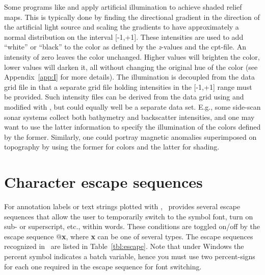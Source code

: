 Some programs like  and  apply artificial
illumination to achieve shaded relief maps.  This is typically done
by finding the directional gradient in the direction of the artificial
light source and scaling the gradients to have approximately a normal
distribution on the interval [-1,+1].  These intensities are used
to add ``white'' or ``black'' to the color as defined by the \emph{z}-values
and the cpt-file.  An intensity of zero leaves the color unchanged.
Higher values will brighten the color, lower values will darken it,
all without changing the original hue of the color (see Appendix~\ref{app:I}
for more details).  The illumination is decoupled from the data
grid file in that a separate grid file holding intensities in the
[-1,+1] range must be provided.  Such intensity files can be
derived from the data grid using  and modified
with , but could equally well be a separate data set.
E.g., some side-scan sonar systems collect both bathymetry and
backscatter intensities, and one may want to use the latter information
to specify the illumination of the colors defined by the former.
Similarly, one could portray magnetic anomalies superimposed on
topography by using the former for colors and the latter for shading. 

\section{Character escape sequences}
\label{sec:escape}

For annotation labels or text strings plotted with ,
\GMT\ provides several escape sequences that allow the user to
temporarily switch to the symbol font, turn on sub- or superscript,
etc., within words.  These conditions are toggled on/off by the
escape sequence @\textbf{x}, where \textbf{x} can be one of several types.
The escape sequences recognized in \GMT\ are listed in Table~\ref{tbl:escape}. 
Note that under Windows the percent symbol indicates a batch variable,
hence you must use two percent-signs for each one required in the escape sequence for font switching.

